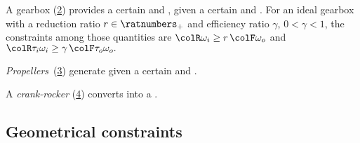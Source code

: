 \begin{figure}[h]
    \begin{center}
    \end{center}
    \caption{\label{fig:dc_motor}}
\end{figure}


\begin{example}
    A gearbox (\cref{fig:gearbox}) provides a certain  and , given a certain
     and . For
    an ideal gearbox with a reduction ratio $r \in \ratnumbers_+$ and
    efficiency ratio $\gamma$, $0<\gamma<1$, the constraints among
    those quantities are ${\colR \omega_i}\geq r\,{\colF \omega_o}$
    and ${\colR \tau_i\omega_i}\geq\gamma\,{\colF \tau_o\omega_o}.$
\end{example}

\begin{figure}[h]
    \begin{center}
    \end{center}
    \caption{}
    \label{fig:gearbox}
\end{figure}


\begin{example}
    \emph{Propellers}~(\cref{fig:propeller}) generate 
    given a certain  and .
\end{example}

\begin{figure}[h]
    \begin{center}
    \end{center}
    \caption{\label{fig:propeller}}
\end{figure}

\begin{example}
    A \emph{crank-rocker} (\cref{fig:crack}) converts  into a .
\end{example}

\begin{figure}[h]
    \centering
    \caption{\label{fig:crack}}
\end{figure}

\subsection{Geometrical constraints}

